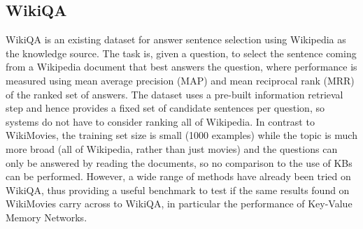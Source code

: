 \documentclass[11pt,letterpaper]{article}
\newcommand{\WikiMovies}{{\sc WikiMovies}\xspace}
\begin{document}
\begin{table}[t!]
	\begin{center}
    	\caption{
	\label{tab:wikiqares}
              { Test results on WikiQA.}}
  	\end{center}
\end{table}


\subsection{WikiQA} \label{sec:wikiqa}

{\sc WikiQA} \citep{yang2015wikiqa} is an existing dataset for answer sentence selection
using Wikipedia as the knowledge source. The task is, given a question, to select
the sentence coming from a Wikipedia document that best answers the question,
where performance is measured using mean average precision (MAP) and mean reciprocal rank (MRR)
of the ranked set of answers. The dataset uses a pre-built
information retrieval step and hence provides a fixed set of candidate sentences per question,
 so systems do not have to consider ranking all of Wikipedia.
In contrast to \WikiMovies, the training set size is small (1000 examples) while
the topic is much more broad (all of Wikipedia, rather than just movies) and the
questions can only be answered by reading the documents, so no comparison to the use
of KBs can be performed. However, a wide range of methods have already been tried on
{\sc WikiQA}, thus providing a useful benchmark to test if the same results
found on \WikiMovies carry across to {\sc WikiQA}, in particular the performance
of Key-Value Memory Networks.
\end{document}
